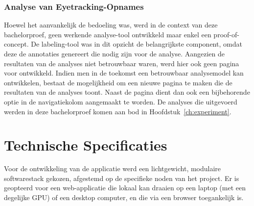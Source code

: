 \subsubsection{Analyse van Eyetracking-Opnames}

Hoewel het aanvankelijk de bedoeling was, werd in de context van deze bachelorproef, geen werkende analyse-tool ontwikkeld maar enkel een proof-of-concept.
De labeling-tool was in dit opzicht de belangrijkste component, omdat deze de annotaties genereert die nodig zijn voor de analyse.
Aangezien de resultaten van de analyses niet betrouwbaar waren, werd hier ook geen pagina voor ontwikkeld.
Indien men in de toekomst een betrouwbaar analysemodel kan ontwikkelen, bestaat de mogelijkheid om een nieuwe pagina te maken die de resultaten van de analyses toont.
Naast de pagina dient dan ook een bijbehorende optie in de navigatiekolom aangemaakt te worden.
De analyses die uitgevoerd werden in deze bachelorproef komen aan bod in Hoofdstuk~\ref{ch:experiment}.

\section{Technische Specificaties}

Voor de ontwikkeling van de applicatie werd een lichtgewicht, modulaire softwarestack gekozen, afgestemd op de specifieke noden van het project.
Er is geopteerd voor een web-applicatie die lokaal kan draaien op een laptop (met een degelijke GPU) of een desktop computer, en die via een browser toegankelijk is.

